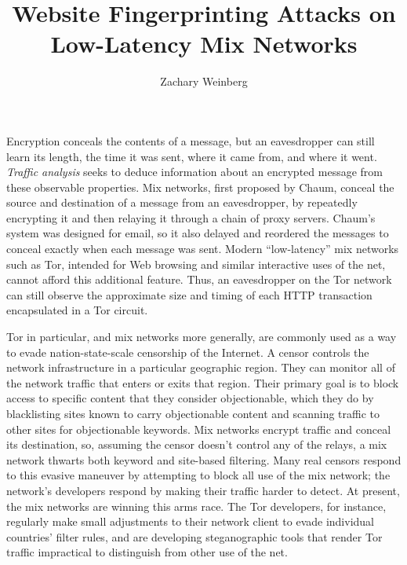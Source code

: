 \documentclass[onecolumn]{cmuecequal}
\begin{document}
\title{Website Fingerprinting Attacks on Low-Latency Mix Networks}
\author{Zachary Weinberg}
\maketitle

\thispagestyle{empty}

Encryption conceals the contents of a message, but an eavesdropper can
still learn its length, the time it was sent, where it came from, and
where it went.  \emph{Traffic analysis} seeks to deduce information
about an encrypted message from these observable properties.  Mix
networks, first proposed by Chaum, conceal the source and destination
of a message from an eavesdropper, by repeatedly encrypting it and
then relaying it through a chain of proxy servers.  Chaum's system was
designed for email, so it also delayed and reordered the messages to
conceal exactly when each message was sent.  Modern “low-latency” mix
networks such as Tor, intended for Web browsing and similar
interactive uses of the net, cannot afford this additional feature.
Thus, an eavesdropper on the Tor network can still observe the
approximate size and timing of each HTTP transaction encapsulated in a
Tor circuit.

Tor in particular, and mix networks more generally, are commonly used
as a way to evade nation-state-scale censorship of the Internet.  A
censor controls the network infrastructure in a particular geographic
region.  They can monitor all of the network traffic that enters or
exits that region.  Their primary goal is to block access to specific
content that they consider objectionable, which they do by
blacklisting sites known to carry objectionable content and scanning
traffic to other sites for objectionable keywords.  Mix networks
encrypt traffic and conceal its destination, so, assuming the censor
doesn't control any of the relays, a mix network thwarts both keyword
and site-based filtering.  Many real censors respond to this evasive
maneuver by attempting to block all use of the mix network; the
network's developers respond by making their traffic harder to detect.
At present, the mix networks are winning this arms race.  The Tor
developers, for instance, regularly make small adjustments to their
network client to evade individual countries' filter rules, and are
developing steganographic tools that render Tor traffic impractical to
distinguish from other use of the net.
\end{document}
